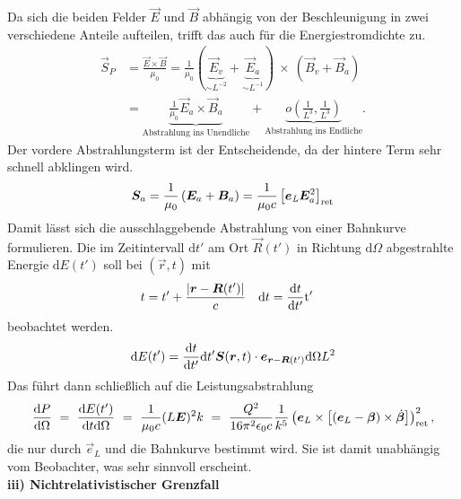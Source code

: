 Da sich die beiden Felder $\vec{E}$ und $\vec{B}$ abhängig von der Beschleunigung in zwei verschiedene Anteile aufteilen, trifft das auch für die Energiestromdichte zu.
\begin{align*}
\vec{S}_P &= \frac{\vec{E}\times\vec{B}}{\mu_0} = \frac{1}{\mu_0}(\underbrace{\vec{E}_v}_{\sim L^{-2}}+\underbrace{\vec{E}_a}_{\sim L^{-1}}) \ \times \ (\vec{B}_v+\vec{B}_a) \\
&=\underbrace{\frac{1}{\mu_0}\vec{E}_a\times\vec{B}_a}_{\text{Abstrahlung ins Unendliche}} + \underbrace{o\left(\frac{1}{L^3},\frac{1}{L^3}\right)}_{\text{Abstrahlung ins Endliche}}.
\end{align*}
Der vordere Abstrahlungsterm ist der Entscheidende, da der hintere Term sehr schnell abklingen wird.
\begin{equation*}
\vec{S}_a = \frac{1}{\mu_0}\left(\vec{E}_a+\vec{B}_a\right) = 
\frac{1}{\mu_0c}\left[\vec{e}_\text{\textit{L}}\vec{E}_a^2\right]_{\text{ret}}
\end{equation*}
Damit lässt sich die ausschlaggebende Abstrahlung von einer Bahnkurve  formulieren.  Die im Zeitintervall $\mathrm{d}t'$ am Ort $\vec{R}(t')$ in Richtung $\mathrm{d}\Omega$ abgestrahlte Energie $\mathrm{d}E(t')$ soll bei $(\vec{r},t)$ mit
\begin{align*}
t &= t' + \frac{|\vec{r}-\vec{R}(t')|}{c} & \mathrm{d}t &= \diff{t}{t'}\mathrm{t'}
\end{align*} 
beobachtet werden. 
\begin{equation*}
\d E(t') = \diff{t}{t'}\d t'\vec{S}(\vec{r},t) \cdot\vec{e}_{\vec{r}-\vec{R}(t')}\d\Omega L^2
\end{equation*}
Das führt dann schließlich auf die Leistungsabstrahlung
\begin{equation*}
\diff{P}{\Omega} \ = \  \frac{\d E(t')}{\d t\d\Omega} \ = \ \frac{1}{\mu_0c}(L\vec{E})^2k \ = \ \frac{Q^2}{16\pi^2\epsilon_0c} \frac{1}{k^5}\left(\vec{e}_L\times\left[(\vec{e}_L-\vec{\beta})\times\dot{\vec{\beta}}\right]\right)^2_\text{ret},
\end{equation*}
die nur durch $\vec{e}_L$ und die Bahnkurve bestimmt wird. Sie ist damit unabhängig vom Beobachter, was sehr sinnvoll erscheint. \\
\newpage
\textbf{iii) \quad Nichtrelativistischer Grenzfall}\\

